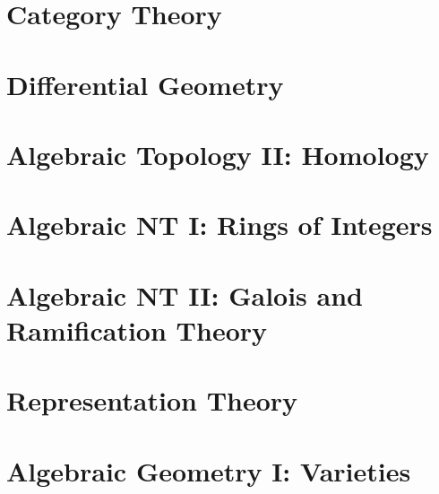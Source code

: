 \documentclass[11pt,numbers=noenddot]{scrreprt}
\begin{document}
\part{Category Theory}


\part{Differential Geometry}



\part{Algebraic Topology II: Homology}





\part{Algebraic NT I: Rings of Integers}





\part{Algebraic NT II: Galois and Ramification Theory}





\part{Representation Theory}





\part{Algebraic Geometry I: Varieties}
\end{document}

